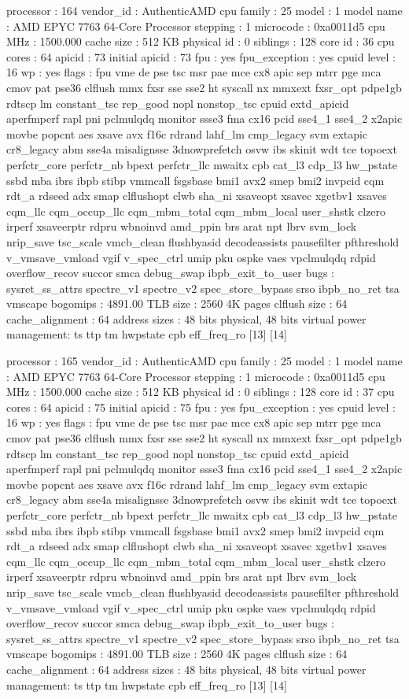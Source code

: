 processor	: 164
vendor_id	: AuthenticAMD
cpu family	: 25
model		: 1
model name	: AMD EPYC 7763 64-Core Processor
stepping	: 1
microcode	: 0xa0011d5
cpu MHz		: 1500.000
cache size	: 512 KB
physical id	: 0
siblings	: 128
core id		: 36
cpu cores	: 64
apicid		: 73
initial apicid	: 73
fpu		: yes
fpu_exception	: yes
cpuid level	: 16
wp		: yes
flags		: fpu vme de pse tsc msr pae mce cx8 apic sep mtrr pge mca cmov pat pse36 clflush mmx fxsr sse sse2 ht syscall nx mmxext fxsr_opt pdpe1gb rdtscp lm constant_tsc rep_good nopl nonstop_tsc cpuid extd_apicid aperfmperf rapl pni pclmulqdq monitor ssse3 fma cx16 pcid sse4_1 sse4_2 x2apic movbe popcnt aes xsave avx f16c rdrand lahf_lm cmp_legacy svm extapic cr8_legacy abm sse4a misalignsse 3dnowprefetch osvw ibs skinit wdt tce topoext perfctr_core perfctr_nb bpext perfctr_llc mwaitx cpb cat_l3 cdp_l3 hw_pstate ssbd mba ibrs ibpb stibp vmmcall fsgsbase bmi1 avx2 smep bmi2 invpcid cqm rdt_a rdseed adx smap clflushopt clwb sha_ni xsaveopt xsavec xgetbv1 xsaves cqm_llc cqm_occup_llc cqm_mbm_total cqm_mbm_local user_shstk clzero irperf xsaveerptr rdpru wbnoinvd amd_ppin brs arat npt lbrv svm_lock nrip_save tsc_scale vmcb_clean flushbyasid decodeassists pausefilter pfthreshold v_vmsave_vmload vgif v_spec_ctrl umip pku ospke vaes vpclmulqdq rdpid overflow_recov succor smca debug_swap ibpb_exit_to_user
bugs		: sysret_ss_attrs spectre_v1 spectre_v2 spec_store_bypass srso ibpb_no_ret tsa vmscape
bogomips	: 4891.00
TLB size	: 2560 4K pages
clflush size	: 64
cache_alignment	: 64
address sizes	: 48 bits physical, 48 bits virtual
power management: ts ttp tm hwpstate cpb eff_freq_ro [13] [14]

processor	: 165
vendor_id	: AuthenticAMD
cpu family	: 25
model		: 1
model name	: AMD EPYC 7763 64-Core Processor
stepping	: 1
microcode	: 0xa0011d5
cpu MHz		: 1500.000
cache size	: 512 KB
physical id	: 0
siblings	: 128
core id		: 37
cpu cores	: 64
apicid		: 75
initial apicid	: 75
fpu		: yes
fpu_exception	: yes
cpuid level	: 16
wp		: yes
flags		: fpu vme de pse tsc msr pae mce cx8 apic sep mtrr pge mca cmov pat pse36 clflush mmx fxsr sse sse2 ht syscall nx mmxext fxsr_opt pdpe1gb rdtscp lm constant_tsc rep_good nopl nonstop_tsc cpuid extd_apicid aperfmperf rapl pni pclmulqdq monitor ssse3 fma cx16 pcid sse4_1 sse4_2 x2apic movbe popcnt aes xsave avx f16c rdrand lahf_lm cmp_legacy svm extapic cr8_legacy abm sse4a misalignsse 3dnowprefetch osvw ibs skinit wdt tce topoext perfctr_core perfctr_nb bpext perfctr_llc mwaitx cpb cat_l3 cdp_l3 hw_pstate ssbd mba ibrs ibpb stibp vmmcall fsgsbase bmi1 avx2 smep bmi2 invpcid cqm rdt_a rdseed adx smap clflushopt clwb sha_ni xsaveopt xsavec xgetbv1 xsaves cqm_llc cqm_occup_llc cqm_mbm_total cqm_mbm_local user_shstk clzero irperf xsaveerptr rdpru wbnoinvd amd_ppin brs arat npt lbrv svm_lock nrip_save tsc_scale vmcb_clean flushbyasid decodeassists pausefilter pfthreshold v_vmsave_vmload vgif v_spec_ctrl umip pku ospke vaes vpclmulqdq rdpid overflow_recov succor smca debug_swap ibpb_exit_to_user
bugs		: sysret_ss_attrs spectre_v1 spectre_v2 spec_store_bypass srso ibpb_no_ret tsa vmscape
bogomips	: 4891.00
TLB size	: 2560 4K pages
clflush size	: 64
cache_alignment	: 64
address sizes	: 48 bits physical, 48 bits virtual
power management: ts ttp tm hwpstate cpb eff_freq_ro [13] [14]

